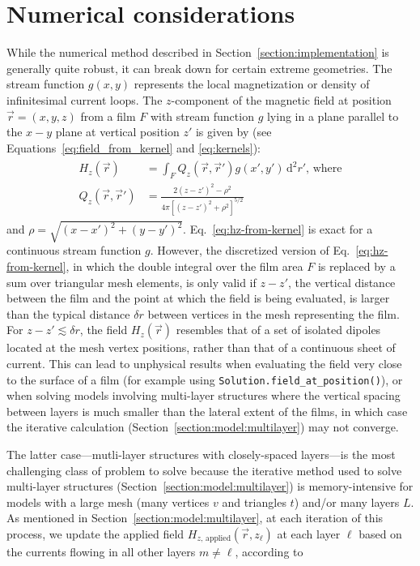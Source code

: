 \documentclass[final,3p,times]{elsarticle}
\newcommand{\inline}[1]{\texttt{#1}\xspace}
\begin{document}
\section{Numerical considerations}
\label{appendix:numerics}
While the numerical method described in Section~\ref{section:implementation} is generally quite robust, it can break down for certain extreme geometries. The stream function $g(x, y)$ represents the local magnetization or density of infinitesimal current loops. The $z$-component of the magnetic field at position $\vec{r}=(x, y, z)$ from a film $F$ with stream function $g$ lying in a plane parallel to the $x-y$ plane at vertical position $z'$ is given by (see Equations~\ref{eq:field_from_kernel} and \ref{eq:kernels}):
\begin{align}
\label{eq:hz-from-kernel}
\begin{split}
    H_z(\vec{r}) &= \int_F Q_z(\vec{r},\vec{r}')g(x', y')\,\mathrm{d}^2r',\,\text{where}\\
    Q_z(\vec{r}, \vec{r}') &=  \frac{2(z-z')^2-\rho^2}
            {4\pi[(z-z')^2+\rho^2]^{5/2}}
\end{split}
\end{align}
and $\rho=\sqrt{(x-x')^2+(y-y')^2}$. Eq.~\ref{eq:hz-from-kernel} is exact for a continuous stream function $g$. However, the discretized version of Eq.~\ref{eq:hz-from-kernel}, in which the double integral over the film area $F$ is replaced by a sum over triangular mesh elements, is only valid if $z-z'$, the vertical distance between the film and the point at which the field is being evaluated, is larger than the typical distance $\delta r$ between vertices in the mesh representing the film. For $z-z'\lesssim\delta r$, the field $H_z(\vec{r})$ resembles that of a set of isolated dipoles located at the mesh vertex positions, rather than that of a continuous sheet of current. This can lead to unphysical results when evaluating the field very close to the surface of a film (for example using \inline{Solution.field_at_position()}), or when solving models involving multi-layer structures where the vertical spacing between layers is much smaller than the lateral extent of the films, in which case the iterative calculation (Section~\ref{section:model:multilayer}) may not converge.

The latter case---mutli-layer structures with closely-spaced layers---is the most challenging class of problem to solve because the iterative method used to solve multi-layer structures (Section~\ref{section:model:multilayer}) is memory-intensive for models with a large mesh (many vertices $v$ and triangles $t$) and/or many layers $L$. As mentioned in Section~\ref{section:model:multilayer}, at each iteration of this process, we update the applied field $H_{z,\,\mathrm{applied}}(\vec{r}, z_\ell)$ at each layer $\ell$ based on the currents flowing in all other layers $m\neq\ell$, according to
\end{document}
